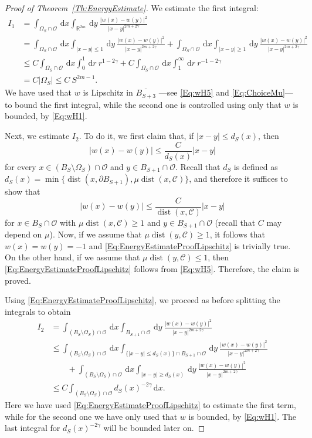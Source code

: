 \documentclass[12pt,reqno]{amsart}
\theoremstyle{definition}
\theoremstyle{remark}
\newcommand{\con}[1]{\mathbb{#1}}
\newcommand{\R}{\con{R}} %
\newcommand{\ccal}{\mathscr{C}}
\newcommand{\ocal}{\mathcal{O}}
\newcommand{\s}{\gamma}
\renewcommand{\d}{\,\mathrm{d}} %
\DeclareMathOperator{\dist}{dist}
\numberwithin{equation}{section}
\begin{document}
\begin{proof}[Proof of Theorem~\ref{Th:EnergyEstimate}]
	We estimate the first integral:
	\begin{align*}
	I_1 &= \int_{\Omega_{S}\cap \ocal} \d x \int_{\R^{2m}} \d y \  \frac{|w(x)-w(y)|^2}{|x-y|^{2m+2\s}} \\
	&= \int_{\Omega_{S}\cap \ocal} \d x \int_{|x-y|\leq 1} \d y \ \frac{|w(x)-w(y)|^2}{|x-y|^{2m+2\s}} + \int_{\Omega_{S}\cap \ocal} \d x \int_{|x-y|\geq 1} \d y \ \frac{|w(x)-w(y)|^2}{|x-y|^{2m+2\s}} \\
	&\leq C \int_{\Omega_{S}\cap \ocal} \d x \int_0^1 \d r \ r^{1-2\s} + C \int_{\Omega_{S}\cap \ocal} \d x \int_1^\infty \d r \ r^{-1-2\s} \\
	&= C |\Omega_S| \leq C \ S^{2m-1}.
	\end{align*}
	We have used that $w$ is Lipschitz in $\overline{B_{S+3}}$ ---see \eqref{Eq:wH5} and \eqref{Eq:ChoiceMu}--- to bound the first integral, while the second one is controlled using only that $w$ is bounded, by \eqref{Eq:wH1}. 
	
	Next, we estimate $I_2$. To do it, we first claim that, if $|x-y|\leq d_S(x)$, then
	\begin{equation}
	\label{Eq:EnergyEstimateProofLipschitz}
	|w(x)-w(y)| \leq \dfrac{C}{d_S(x)} |x-y|	
	\end{equation}
	for every $x\in (B_S\setminus \Omega_S)\cap \ocal$ and $y \in B_{S+1}\cap \ocal$. Recall that $d_S$ is defined as $d_S(x)=\min \{\dist(x,\partial B_{S+1}) , \mu \dist (x, \ccal)\}$, and therefore it suffices to show that
	$$
	|w(x)-w(y)| \leq \dfrac{C}{\dist (x, \ccal)} |x-y|
	$$
	for $x\in B_S \cap \ocal$ with $\mu \dist (x, \ccal) \geq 1$ and $y \in B_{S+1}\cap \ocal$ (recall that $C$ may depend on $\mu$). Now, if we assume that $\mu \dist (y, \ccal) \geq 1$, it follows that $w(x)=w(y)=-1$ and \eqref{Eq:EnergyEstimateProofLipschitz} is trivially true. On the other hand, if we assume that $\mu \dist (y, \ccal) \leq 1$, then \eqref{Eq:EnergyEstimateProofLipschitz} follows from \eqref{Eq:wH5}. Therefore, the claim is proved.
	
	Using \eqref{Eq:EnergyEstimateProofLipschitz}, we proceed as before splitting the integrals to obtain
	\begin{align*}
	I_2 &= \int_{(B_S\setminus \Omega_S)\cap \ocal} \d x \int_{B_{S+1}\cap \ocal} \d y \  \frac{|w(x)-w(y)|^2}{|x-y|^{2m+2\s}}   \\
	&\leq \int_{(B_S\setminus \Omega_S)\cap \ocal} \d x \int_{ \{|x-y|\leq d_S(x)\} \cap B_{S+1}\cap \ocal} \d y \  \frac{|w(x)-w(y)|^2}{|x-y|^{2m+2\s}} \\
	& \quad \quad + \int_{(B_S\setminus \Omega_S)\cap \ocal} \d x \int_{|x-y|\geq d_S(x)} \d y \ \frac{|w(x)-w(y)|^2}{|x-y|^{2m+2\s}} \\
	&\leq C \int_{(B_S\setminus \Omega_S)\cap \ocal} d_S(x)^{-2\s} \d x .
	\end{align*}
	Here we have used \eqref{Eq:EnergyEstimateProofLipschitz} to estimate the first term, while for the second one we have only used that $w$ is bounded, by \eqref{Eq:wH1}. The last integral for $d_S(x)^{-2\s}$ will be bounded later on.
	

\end{proof}
\end{document}
